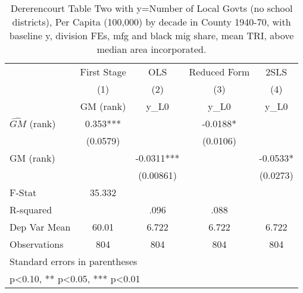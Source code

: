 \begin{table}[htbp]\centering
\def\sym#1{\ifmmode^{#1}\else\(^{#1}\)\fi}
\caption{Dererencourt Table Two with y=Number of Local Govts (no school districts), Per Capita (100,000) by decade in County 1940-70, with baseline y, division FEs, mfg and black mig share, mean TRI, above median area incorporated.}
\begin{tabular}{l*{4}{c}}
\toprule
                    & First Stage   &         OLS   &Reduced Form   &        2SLS   \\
                    &\multicolumn{1}{c}{(1)}&\multicolumn{1}{c}{(2)}&\multicolumn{1}{c}{(3)}&\multicolumn{1}{c}{(4)}\\
                    &\multicolumn{1}{c}{GM  (rank)}&\multicolumn{1}{c}{y\_L0}&\multicolumn{1}{c}{y\_L0}&\multicolumn{1}{c}{y\_L0}\\
\midrule
$\hat{GM}$ (rank)   &       0.353***&               &     -0.0188*  &               \\
                    &    (0.0579)   &               &    (0.0106)   &               \\
\addlinespace
GM  (rank)          &               &     -0.0311***&               &     -0.0533*  \\
                    &               &   (0.00861)   &               &    (0.0273)   \\
\midrule
F-Stat              &      35.332   &               &               &               \\
R-squared           &               &        .096   &        .088   &               \\
Dep Var Mean        &       60.01   &       6.722   &       6.722   &       6.722   \\
Observations        &         804   &         804   &         804   &         804   \\
\bottomrule
\multicolumn{5}{l}{\footnotesize Standard errors in parentheses}\\
\multicolumn{5}{l}{\footnotesize * p<0.10, ** p<0.05, *** p<0.01}\\
\end{tabular}
\end{table}

